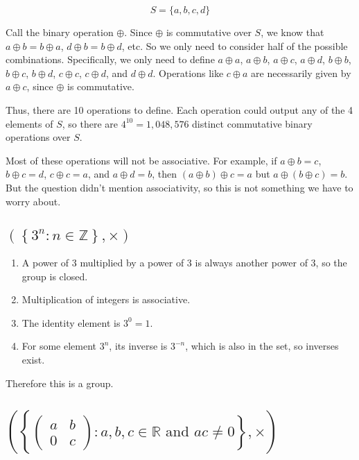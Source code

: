 \documentclass[a4paper]{article}
\begin{document}

$$S = \{a, b, c, d\}$$

Call the binary operation $\oplus$. Since $\oplus$ is commutative over $S$, we know that $a \oplus b = b \oplus a$, $d \oplus b = b \oplus d$, etc. So we only need to consider half of the possible combinations. Specifically, we only need to define $a \oplus a$, $a \oplus b$, $a \oplus c$, $a \oplus d$, $b \oplus b$, $b \oplus c$, $b \oplus d$, $c \oplus c$, $c \oplus d$, and $d \oplus d$. Operations like $c \oplus a$ are necessarily given by $a \oplus c$, since $\oplus$ is commutative.

Thus, there are 10 operations to define. Each operation could output any of the 4 elements of $S$, so there are $4^{10} = 1,048,576$ distinct commutative binary operations over $S$.

Most of these operations will not be associative. For example, if $a \oplus b = c$, $b \oplus c = d$, $c \oplus c = a$, and $a \oplus d = b$, then $(a \oplus b) \oplus c = a$ but $a \oplus (b \oplus c) = b$. But the question didn't mention associativity, so this is not something we have to worry about.


\subsection{$\left( \left\{ 3^n : n \in \mathbb Z \right\}, \times \right)$}

\begin{enumerate}
	\item A power of 3 multiplied by a power of 3 is always another power of 3, so the group is closed.
	\item Multiplication of integers is associative.
	\item The identity element is $3^0 = 1$.
	\item For some element $3^n$, its inverse is $3^{-n}$, which is also in the set, so inverses exist.
\end{enumerate}

Therefore this is a group.

\subsection{$\left( \left\{ \begin{pmatrix}a & b\\ 0 & c\end{pmatrix} : a, b, c \in \mathbb R \text{ and } ac \ne 0 \right\}, \times \right)$}
\end{document}
